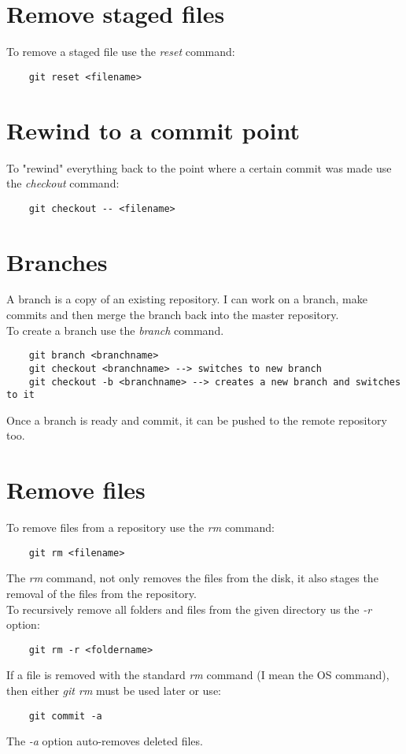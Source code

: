 \documentclass[10pt,letterpaper]{book}
\begin{document}
\section{Remove staged files}
To remove a staged file use the \textit{reset} command:
\begin{lstlisting}
	git reset <filename>
\end{lstlisting}

\section{Rewind to a commit point}
To "rewind" everything back to the point where a certain commit was made use the \textit{checkout} command:
\begin{lstlisting}
	git checkout -- <filename>
\end{lstlisting}

\section{Branches}
A branch is a copy of an existing repository. I can work on a branch, make commits and then merge the branch back into the master repository.\\
To create a branch use the \textit{branch} command.
\begin{lstlisting}
	git branch <branchname>
	git checkout <branchname> --> switches to new branch
	git checkout -b <branchname> --> creates a new branch and switches to it
\end{lstlisting}
Once a branch is ready and commit, it can be pushed to the remote repository too.

\section{Remove files}
To remove files from a repository use the \textit{rm} command:
\begin{lstlisting}
	git rm <filename>
\end{lstlisting}
The \textit{rm} command, not only removes the files from the disk, it also stages the removal of the files from the repository.\\
To recursively remove all folders and files from the given directory us the \textit{-r} option:
\begin{lstlisting}
	git rm -r <foldername>
\end{lstlisting}
If a file is removed with the standard \textit{rm} command (I mean the OS command), then either \textit{git rm} must be used later or use:
\begin{lstlisting}
	git commit -a
\end{lstlisting}
The \textit{-a} option auto-removes deleted files.
\end{document}
